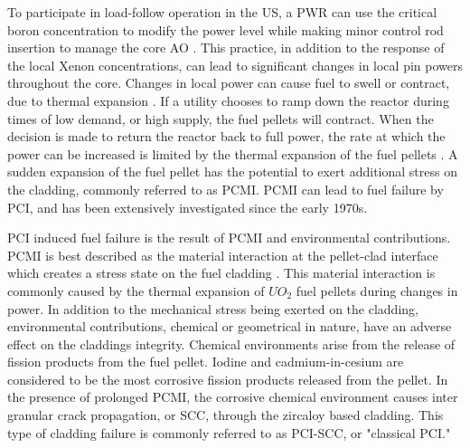 \documentclass[edeposit,fullpage,12pt]{uiucthesis2009}
\begin{document}
To participate in load-follow operation in the \gls{US}, a \gls{PWR} can use the critical boron concentration to modify the power level while making minor control rod insertion to manage the core \gls{AO} \cite{lokhov_technical_2011}.  
This practice, in addition to the response of the local Xenon concentrations, can lead to significant changes in local pin powers throughout the core.
Changes in local power can cause fuel to swell or contract, due to thermal expansion \cite{gartner_power_1984}. %
If a utility chooses to ramp down the reactor during times of low demand, or high supply, the fuel pellets will contract.
When the decision is made to return the reactor back to full power, the rate at which the power can be increased is limited by the thermal expansion of the fuel pellets \cite{gartner_power_1984}.
A sudden expansion of the fuel pellet has the potential to exert additional stress on the cladding, commonly referred to as \gls{PCMI}.
\gls{PCMI} can lead to fuel failure by \gls{PCI}, and has been extensively investigated since the early 1970s.

\gls{PCI} induced fuel failure is the result of \gls{PCMI} and environmental contributions.
\gls{PCMI} is best described as the material interaction at the pellet-clad interface which creates a stress state on the fuel cladding \cite{kennard_pci_2016}.
This material interaction is commonly caused by the thermal expansion of $UO_2$ fuel pellets during changes in power.
In addition to the mechanical stress being exerted on the cladding, environmental contributions, chemical or geometrical in nature, have an adverse effect on the claddings integrity.
Chemical environments arise from the release of fission products from the fuel pellet.
Iodine and cadmium-in-cesium are considered to be the most corrosive fission products released from the pellet. %
In the presence of prolonged \gls{PCMI}, the corrosive chemical environment causes inter granular crack propagation, or \gls{SCC}, through the zircaloy based cladding.
This type of cladding failure is commonly referred to as \gls{PCI}-\gls{SCC}, or "classical \gls{PCI}."

\end{document}

